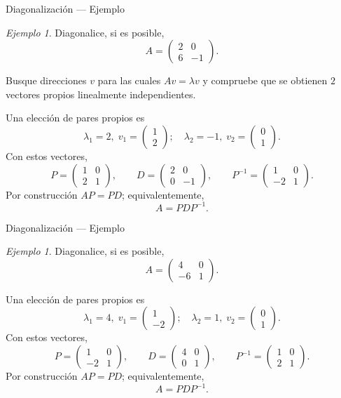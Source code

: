 \documentclass[aspectratio=169,11pt]{beamer}
\theoremstyle{remark}
\newtheorem{Ejem}[definicion]{Ejemplo}
\begin{document}
\begin{frame}[shrink=5]{Diagonalización — Ejemplo}
\footnotesize
\begin{Ejem}

Diagonalice, si es posible,
\[
A=\begin{pmatrix}2 & 0\\6 & -1\end{pmatrix}.
\]


Busque direcciones $v$ para las cuales $Av=\lambda v$ y compruebe que se obtienen $2$ vectores propios linealmente independientes.

\scriptsize
Una elección de pares propios es
\[
\lambda_1=2,\;v_1=\begin{pmatrix}1\\2\end{pmatrix};\quad \lambda_2=-1,\;v_2=\begin{pmatrix}0\\1\end{pmatrix}.
\]
Con estos vectores,
\[
P=\begin{pmatrix}1 & 0\\2 & 1\end{pmatrix},\qquad D=\begin{pmatrix}2 & 0\\0 & -1\end{pmatrix},\qquad P^{-1}=\begin{pmatrix}1 & 0\\-2 & 1\end{pmatrix}.
\]
Por construcción $AP=PD$; equivalentemente,
\[
\boxed{A=PDP^{-1}}.
\]

\end{Ejem}
\end{frame}

\begin{frame}[shrink=5]{Diagonalización — Ejemplo}
\footnotesize
\begin{Ejem}


Diagonalice, si es posible,
\[
A=\begin{pmatrix}4 & 0\\-6 & 1\end{pmatrix}.
\]

\scriptsize
Una elección de pares propios es
\[
\lambda_1=4,\;v_1=\begin{pmatrix}1\\-2\end{pmatrix};\quad \lambda_2=1,\;v_2=\begin{pmatrix}0\\1\end{pmatrix}.
\]
Con estos vectores,
\[
P=\begin{pmatrix}1 & 0\\-2 & 1\end{pmatrix},\qquad D=\begin{pmatrix}4 & 0\\0 & 1\end{pmatrix},\qquad P^{-1}=\begin{pmatrix}1 & 0\\2 & 1\end{pmatrix}.
\]
Por construcción $AP=PD$; equivalentemente,
\[
\boxed{A=PDP^{-1}}.
\]
\end{Ejem}
\end{frame}
\end{document}
